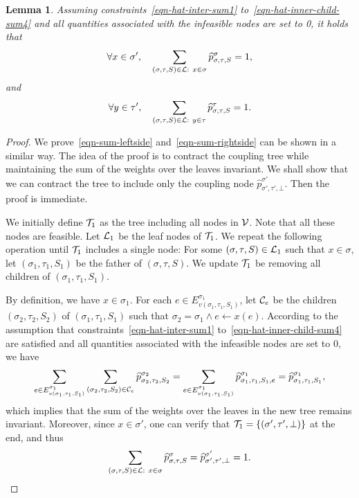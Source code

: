 \documentclass[11pt]{article}
\newtheorem{lemma}[theorem]{Lemma}
\newcommand{\set}[1]{\left\{#1\right\}}
\newcommand{\wh}[1]{\widehat{#1}}
\begin{document}
\begin{lemma} \label{lem:ratio-identity-partial}
    Assuming constraints~\eqref{eqn-hat-inter-sum1} to~\eqref{eqn-hat-inner-child-sum4} and all quantities associated with the infeasible nodes are set to 0, it holds that
    \begin{align}\label{eqn-sum-leftside}
        \forall x\in \sigma', \quad \sum_{(\sigma,\tau,S)\in \mathcal{L}: \ x\in \sigma} \widehat{p}^{\sigma}_{\sigma,\tau,S}=1,
    \end{align}
    and
    \begin{align}\label{eqn-sum-rightside}
        \forall y\in \tau', \quad \sum_{(\sigma,\tau,S)\in \mathcal{L}: \ y\in \tau} \widehat{p}^{\tau}_{\sigma,\tau,S}=1.
    \end{align}
\end{lemma}
\begin{proof}
    We prove~\eqref{eqn-sum-leftside} and~\eqref{eqn-sum-rightside} can be shown in a similar way.
    The idea of the proof is to contract the coupling tree while maintaining the sum of the weights over the leaves invariant. We shall show that we can contract the tree to include only the coupling node $\wh{p}_{\sigma', \tau', \bot}^{\sigma'}$. Then the proof is immediate.

    We initially define $\mathcal{T}_1$ as the tree including all nodes in $\mathcal{V}$. Note that all these nodes are feasible. Let $\mathcal{L}_1$ be the leaf nodes of $\mathcal{T}_1$. We repeat the following operation until $\mathcal{T}_1$ includes a single node: For some $(\sigma,\tau,S )\in \mathcal{L}_1$ such that $x\in \sigma$, let $(\sigma_1,\tau_1,S_1)$ be the father of $(\sigma,\tau,S)$. We update $\mathcal{T}_1$ be removing all children of $(\sigma_1,\tau_1,S_1)$.

    By definition, we have $x\in \sigma_1$. For each $e\in E^{\sigma_1}_{v(\sigma_1,\tau_1,S_1)}$, let $\mathcal{C}_e$ be the children $(\sigma_2,\tau_2,S_2)$ of $(\sigma_1,\tau_1,S_1)$ such that $\sigma_2=\sigma_1\land e\gets x(e)$. According to the assumption that constraints~\eqref{eqn-hat-inter-sum1} to~\eqref{eqn-hat-inner-child-sum4} are satisfied and all quantities associated with the infeasible nodes are set to 0, we have 
    \begin{align*}
       \sum_{e\in E^{\sigma_1}_{v(\sigma_1,\tau_1,S_1)}}\sum_{(\sigma_2,\tau_2,S_2)\in \+C_e} \wh{p}^{\sigma_2}_{\sigma_2,\tau_2,S_2}=\sum_{e\in E^{\sigma_1}_{v(\sigma_1,\tau_1,S_1)}}  \wh{p}^{\sigma_1}_{\sigma_1,\tau_1,S_1,e} =\wh{p}^{\sigma_1}_{\sigma_1,\tau_1,S_1},
    \end{align*} which implies that the sum of the weights over the leaves in the new tree remains invariant. Moreover, since $x\in \sigma'$, one can verify that $\+T_1=\set{(\sigma',\tau',\bot)}$ at the end, and thus
    \begin{align*}
        \sum_{(\sigma,\tau,S)\in \+L: \ x\in \sigma} \widehat{p}^{\sigma}_{\sigma,\tau,S} = \wh{p}^{\sigma'}_{\sigma',\tau',\bot}=1.
    \end{align*}


\end{proof}
\end{document}
